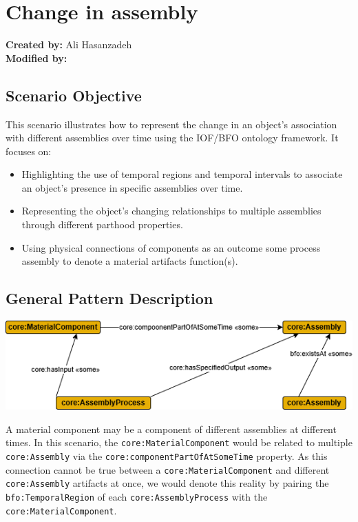 \section{Change in assembly}

\textbf{Created by:} Ali Hasanzadeh \\
\textbf{Modified by:}  \\

\subsection*{Scenario Objective}

This scenario illustrates how to represent the change in an object's association with different assemblies over time using the IOF/BFO ontology framework. It focuses on:
\begin{itemize}
    \item Highlighting the use of temporal regions and temporal intervals to associate an object's presence in specific assemblies over time.
    \item Representing the object's changing relationships to multiple assemblies through different parthood properties.
    \item Using physical connections of components as an outcome some process assembly to denote a material artifacts function(s). 
\end{itemize}

\subsection*{General Pattern Description}

\includegraphics[scale=0.48]{scenarios/assemblies-components/images/assembly-component-general-pattern-description.png}

A material component may be a component of different assemblies at different times. In this scenario, the \texttt{core:MaterialComponent} would be related to multiple \texttt{core:Assembly} via the \texttt{core:componentPartOfAtSomeTime} property. As this connection cannot be true between a \texttt{core:MaterialComponent} and different \texttt{core:Assembly} artifacts at once, we would denote this reality by pairing the \texttt{bfo:TemporalRegion} of each \texttt{core:AssemblyProcess} with the \texttt{core:MaterialComponent}.

